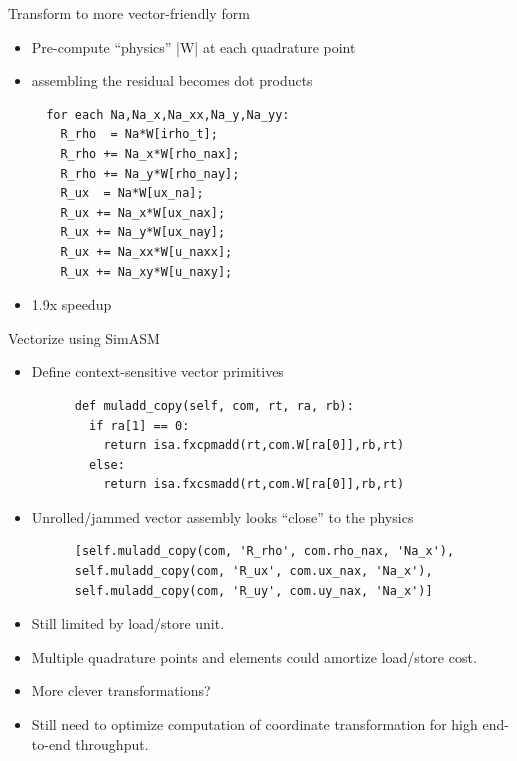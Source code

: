 \begin{frame}[fragile]{Transform to more vector-friendly form}
  \begin{itemize}
  \item Pre-compute ``physics'' \cverb|W| at each quadrature point
  \item assembling the residual becomes dot products
  \begin{verbatim}
  for each Na,Na_x,Na_xx,Na_y,Na_yy:
    R_rho  = Na*W[irho_t];
    R_rho += Na_x*W[rho_nax];
    R_rho += Na_y*W[rho_nay];
    R_ux  = Na*W[ux_na];
    R_ux += Na_x*W[ux_nax];
    R_ux += Na_y*W[ux_nay];
    R_ux += Na_xx*W[u_naxx];
    R_ux += Na_xy*W[u_naxy];
  \end{verbatim}
  \item 1.9x speedup
  \end{itemize}
\end{frame}

\begin{frame}[fragile]{Vectorize using SimASM}
  \begin{itemize}
  \item Define context-sensitive vector primitives
    \begin{verbatim}
      def muladd_copy(self, com, rt, ra, rb):
        if ra[1] == 0:
          return isa.fxcpmadd(rt,com.W[ra[0]],rb,rt)
        else:
          return isa.fxcsmadd(rt,com.W[ra[0]],rb,rt)
    \end{verbatim}
  \item Unrolled/jammed vector assembly looks ``close'' to the physics
    \begin{verbatim}
      [self.muladd_copy(com, 'R_rho', com.rho_nax, 'Na_x'),
      self.muladd_copy(com, 'R_ux', com.ux_nax, 'Na_x'),
      self.muladd_copy(com, 'R_uy', com.uy_nax, 'Na_x')]
    \end{verbatim}
  \item Still limited by load/store unit.
  \item Multiple quadrature points and elements could amortize load/store cost.
  \item More clever transformations?
  \item Still need to optimize computation of coordinate transformation for high end-to-end throughput.
  \end{itemize}
\end{frame}
